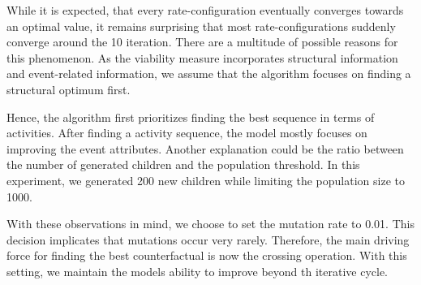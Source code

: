 \documentclass[./../../paper.tex]{subfiles}
\begin{document}
While it is expected, that every rate-configuration eventually converges towards an optimal value, it remains surprising that most rate-configurations suddenly converge around the 10 iteration. 
There are a multitude of possible reasons for this phenomenon. As the viability measure incorporates structural information and event-related information, we assume that the algorithm focuses on finding a structural optimum first. 

Hence, the algorithm first prioritizes finding the best sequence in terms of activities. After finding a activity sequence, the model mostly focuses on improving the event attributes. 
Another explanation could be the ratio between the number of generated children and the population threshold. In this experiment, we generated 200 new children while limiting the population size to 1000.  


With these observations in mind, we choose to set the mutation rate to 0.01.   This decision implicates that mutations occur very rarely. Therefore, the main driving force for finding the best counterfactual is now the crossing operation. With this setting, we maintain the models ability to improve beyond th iterative cycle.
\end{document}

